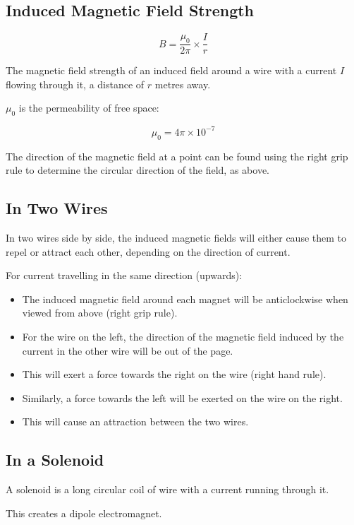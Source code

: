 \documentclass[a4paper,11pt]{report}
\begin{document}
\subsection{Induced Magnetic Field Strength}

$$
B = \frac{\mu_0}{2\pi} \times \frac{I}{r}
$$

The magnetic field strength of an induced field around a wire with a current
$I$ flowing through it, a distance of $r$ metres away.

$\mu_0$ is the permeability of free space:

$$
\mu_0 = 4\pi \times 10^{-7}
$$

The direction of the magnetic field at a point can be found using the right
grip rule to determine the circular direction of the field, as above.

\subsection{In Two Wires}

In two wires side by side, the induced magnetic fields will either cause them
to repel or attract each other, depending on the direction of current.

For current travelling in the same direction (upwards):

\begin{itemize}
\item The induced magnetic field around each magnet will be anticlockwise when
	viewed from above (right grip rule).
\item For the wire on the left, the direction of the magnetic field induced by
	the current in the other wire will be out of the page.
\item This will exert a force towards the right on the wire (right hand rule).
\item Similarly, a force towards the left will be exerted on the wire on the
	right.
\item This will cause an attraction between the two wires.
\end{itemize}

\subsection{In a Solenoid}

A solenoid is a long circular coil of wire with a current running through it.

This creates a dipole electromagnet.
\end{document}
